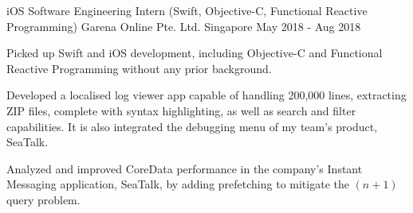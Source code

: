 

\begin{cventries}


	\cventry
		{iOS Software Engineering Intern (Swift, Objective-C, Functional Reactive Programming)} %
		{Garena Online Pte. Ltd.} %
		{Singapore} %
		{May 2018 - Aug 2018} %
		{
			\begin{cvitems}
				\item {Picked up Swift and iOS development, including Objective-C and Functional Reactive Programming without any prior background.}
				\item {Developed a localised log viewer app capable of handling 200,000 lines, extracting ZIP files, complete with syntax highlighting, as well as search and filter capabilities. It is also integrated the debugging menu of my team's product, SeaTalk.}
				\item {Analyzed and improved CoreData performance in the company's Instant Messaging application, SeaTalk, by adding prefetching to mitigate the $(n+1)$ query problem.}
			\end{cvitems}
		}


\end{cventries}
